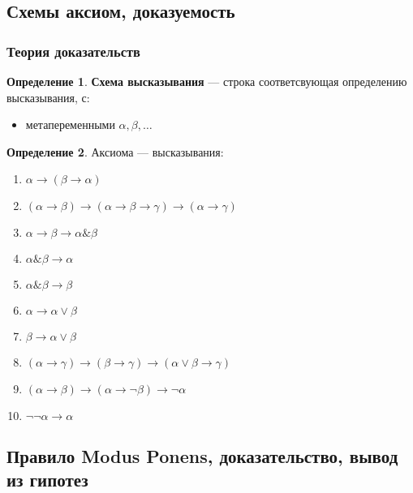 \documentclass[english]{article}
\theoremstyle{plain}
\theoremstyle{remark}
\theoremstyle{definition}
\newtheorem*{definition}{Определение}
\begin{document}
\subsection{Схемы аксиом, доказуемость}
\label{sec:orgcd1ce77}
\subsubsection{Теория доказательств}
\label{sec:orgb656974}
\begin{definition}
\textbf{Схема высказывания} --- строка соответсвующая определению высказывания, с:
\begin{itemize}
\item метапеременными \(\alpha, \beta, \dots\)
\end{itemize}
\end{definition}
\begin{definition}
Аксиома --- высказывания:
\begin{enumerate}
\item \(\alpha \to (\beta \to \alpha)\)
\item \((\alpha \to \beta) \to (\alpha \to \beta \to \gamma) \to (\alpha \to \gamma)\)
\item \(\alpha \to \beta \to \alpha \& \beta\)
\item \(\alpha \& \beta \to \alpha\)
\item \(\alpha \& \beta \to \beta\)
\item \(\alpha \to \alpha \vee \beta\)
\item \(\beta \to \alpha \vee \beta\)
\item \((\alpha \to \gamma) \to (\beta \to \gamma) \to (\alpha \vee \beta \to \gamma)\)
\item \((\alpha \to \beta) \to (\alpha \to \neg \beta) \to \neg \alpha\)
\item \(\neg\neg \alpha \to \alpha\)
\end{enumerate}
\end{definition}
\subsection{Правило Modus Ponens, доказательство, вывод из гипотез}
\label{sec:org90085c0}
\end{document}
